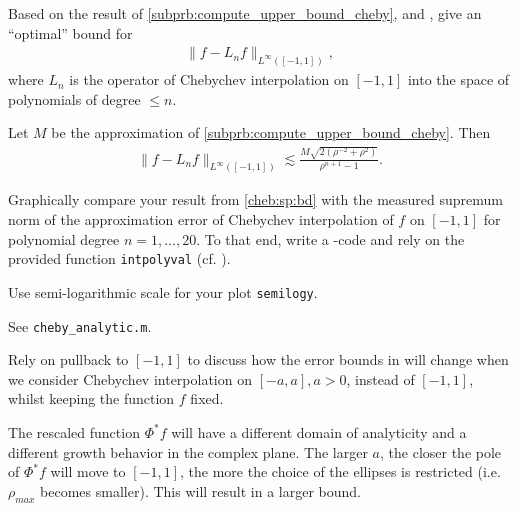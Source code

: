 \begin{problem}
\begin{subproblem}[2]
  \label{cheb:sp:bd}
 Based on the result of \ref{subprb:compute_upper_bound_cheby}, and  , give an ``optimal'' bound for
 \begin{align*}
  \lVert f - L_n f \rVert_{L^\infty([-1,1])},
 \end{align*}
 where $L_n$ is the operator of Chebychev interpolation on $[-1,1]$ into the space
 of polynomials of degree $\leq n$.

 \begin{solution}
 Let $M$ be the approximation of \ref{subprb:compute_upper_bound_cheby}. Then
 \begin{align*}
   \lVert f - L_n f \rVert_{L^\infty([-1,1])} \lesssim \frac{M \sqrt{2 (\rho^{-2} + \rho^{2})}}{\rho^{n+1} - 1}.
 \end{align*}
 \end{solution}
\end{subproblem}

\begin{subproblem}[1]
  Graphically compare your result from \ref{cheb:sp:bd} with the measured supremum
  norm of the approximation error of Chebychev interpolation of $f$ on $[-1,1]$
  for polynomial degree $n = 1,\dots,20$. To that end, write a \Matlab{}-code and
  rely on the provided function \verb|intpolyval| (cf. ).
 \begin{hint}
  Use semi-logarithmic scale for your plot \verb|semilogy|.
 \end{hint}
 \cprotEnv \begin{solution}
   See \verb|cheby_analytic.m|.
 \end{solution}
\end{subproblem}

\begin{subproblem}[4]
 Rely on pullback to $[-1,1]$ to discuss how the error bounds in
  will change when we consider Chebychev interpolation on
 $[-a,a], a > 0$, instead of $[-1,1]$, whilst keeping the function $f$ fixed.

 \begin{solution}
   The rescaled function $\Phi^{\ast}f$ will have a different domain of
     analyticity and a different growth behavior in the complex plane. The larger
     $a$, the closer the pole of $\Phi^{\ast}f$ will move to $[-1,1]$, the more
     the choice of the ellipses is restricted (i.e. $\rho_{max}$ becomes smaller). This will result in a larger bound.
   

\end{solution}
\end{subproblem}
\end{problem}
